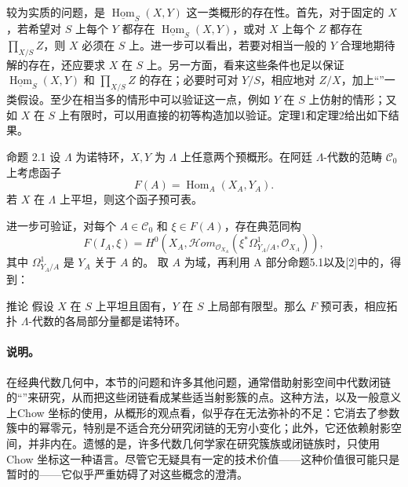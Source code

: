 较为实质的问题，是 $\underline{\operatorname{Hom}}_S(X,Y)$ 这一类概形的存在性。首先，对于固定的 $X$，若希望对 $S$ 上每个 $Y$ 都存在 $\underline{\operatorname{Hom}}_S(X,Y)$，或对 $X$ 上每个 $Z$ 都存在 $\prod_{X/S}Z$，则 $X$ 必须在 $S$ 上。进一步可以看出，若要对相当一般的 $Y$ 合理地期待解的存在，还应要求 $X$ 在 $S$ 上。另一方面，看来这些条件也足以保证 $\underline{\operatorname{Hom}}_S(X,Y)$ 和 $\prod_{X/S}Z$ 的存在；必要时可对 $Y/S$，相应地对 $Z/X$，加上“”一类假设。至少在相当多的情形中可以验证这一点，例如 $Y$ 在 $S$ 上仿射的情形；又如 $X$ 在 $S$ 上有限时，可以用直接的初等构造加以验证。定理1和定理2给出如下结果。

\begin{statement}{命题 2.1}
设 $\Lambda$ 为诺特环，$X,Y$ 为 $\Lambda$ 上任意两个预概形。在阿廷 $\Lambda$-代数的范畴 $\mathcal C_0$ 上考虑函子
\[
 F(A)=\operatorname{Hom}_A(X_A,Y_A).
\]
若 $X$ 在 $\Lambda$ 上平坦，则这个函子预可表。
\end{statement}
进一步可验证，对每个 $A\in\mathcal C_0$ 和 $\xi\in F(A)$，存在典范同构
\[
 F(I_A,\xi)=H^0\!\left(X_A,
 \mathcal Hom_{\mathcal O_{X_A}}\!\left(\xi^*\Omega^1_{Y_A/A},\mathcal O_{X_A}\right)\right),
\]
其中 $\Omega^1_{Y_A/A}$ 是 $Y_A$ 关于 $A$ 的。
取 $A$ 为域，再利用 A 部分命题5.1以及[2]中的，得到：
\begin{statement}{推论}
假设 $X$ 在 $S$ 上平坦且固有，$Y$ 在 $S$ 上局部有限型。那么 $F$ 预可表，相应拓扑 $\Lambda$-代数的各局部分量都是诺特环。
\end{statement}
\paragraph{说明。}
在经典代数几何中，本节的问题和许多其他问题，通常借助射影空间中代数闭链的“”来研究，从而把这些闭链看成某些适当射影簇的点。这种方法，以及一般意义上Chow 坐标的使用，从概形的观点看，似乎存在无法弥补的不足：它消去了参数簇中的幂零元，特别是不适合充分研究闭链的无穷小变化；此外，它还依赖射影空间，并非内在。遗憾的是，许多代数几何学家在研究簇族或闭链族时，只使用Chow 坐标这一种语言。尽管它无疑具有一定的技术价值——这种价值很可能只是暂时的——它似乎严重妨碍了对这些概念的澄清。

